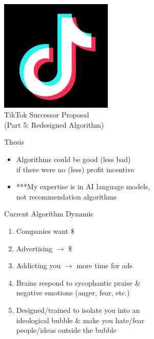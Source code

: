 \documentclass[aspectratio=35]{beamer} %
\begin{document}
\begin{frame}
\centering
\vspace{-1in}
\includegraphics[width=0.4\textwidth]{imgs/app_icons/tiktok-icon2.png}\\
TikTok Successor Proposal \\
(Part 5: Redesigned Algorithm)
\end{frame}

\begin{frame}{Thesis}
\vspace{-1.8in}
\begin{itemize}
    \item Algorithms could be good (less bad)\\if there were no (less) profit incentive
    \item ***My expertise is in AI language models,\\not recommendation algorithms
 \end{itemize}
\end{frame}

\begin{frame}{Current Algorithm Dynamic}
\vspace{-1.4in}
\begin{enumerate}
    \item Companies want \$
    \item Advertising $\rightarrow$ \$
    \item Addicting you $\rightarrow$ more time for ads
    \item Brains respond to sycophantic praise \&\\negative emotions (anger, fear, etc.)
    \item Designed/trained to isolate you into an\\ideological bubble \& make you hate/fear\\people/ideas outside the bubble
\end{enumerate}
\end{frame}
\end{document}
